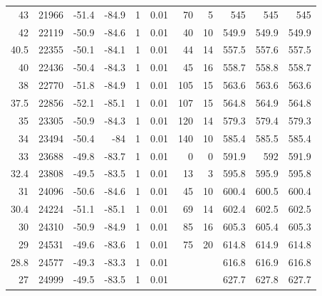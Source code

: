 \documentclass{article}
\begin{document}
\begin{longtable}{|r|r|r|r|r|r|r|r|r|r|r}
43 & 21966 & -51.4 & -84.9 & 1 & 0.01 & 70 & 5 & 545 & 545 & 545 \\
42 & 22119 & -50.9 & -84.6 & 1 & 0.01 & 40 & 10 & 549.9 & 549.9 & 549.9 \\
40.5 & 22355 & -50.1 & -84.1 & 1 & 0.01 & 44 & 14 & 557.5 & 557.6 & 557.5 \\
40 & 22436 & -50.4 & -84.3 & 1 & 0.01 & 45 & 16 & 558.7 & 558.8 & 558.7 \\
38 & 22770 & -51.8 & -84.9 & 1 & 0.01 & 105 & 15 & 563.6 & 563.6 & 563.6 \\
37.5 & 22856 & -52.1 & -85.1 & 1 & 0.01 & 107 & 15 & 564.8 & 564.9 & 564.8 \\
35 & 23305 & -50.9 & -84.3 & 1 & 0.01 & 120 & 14 & 579.3 & 579.4 & 579.3 \\
34 & 23494 & -50.4 & -84 & 1 & 0.01 & 140 & 10 & 585.4 & 585.5 & 585.4 \\
33 & 23688 & -49.8 & -83.7 & 1 & 0.01 & 0 & 0 & 591.9 & 592 & 591.9 \\
32.4 & 23808 & -49.5 & -83.5 & 1 & 0.01 & 13 & 3 & 595.8 & 595.9 & 595.8 \\
31 & 24096 & -50.6 & -84.6 & 1 & 0.01 & 45 & 10 & 600.4 & 600.5 & 600.4 \\
30.4 & 24224 & -51.1 & -85.1 & 1 & 0.01 & 69 & 14 & 602.4 & 602.5 & 602.5 \\
30 & 24310 & -50.9 & -84.9 & 1 & 0.01 & 85 & 16 & 605.3 & 605.4 & 605.3 \\
29 & 24531 & -49.6 & -83.6 & 1 & 0.01 & 75 & 20 & 614.8 & 614.9 & 614.8 \\
28.8 & 24577 & -49.3 & -83.3 & 1 & 0.01 &   &   & 616.8 & 616.9 & 616.8 \\
27 & 24999 & -49.5 & -83.5 & 1 & 0.01 &   &   & 627.7 & 627.8 & 627.7 \\
\end{longtable}%
\end{document}
